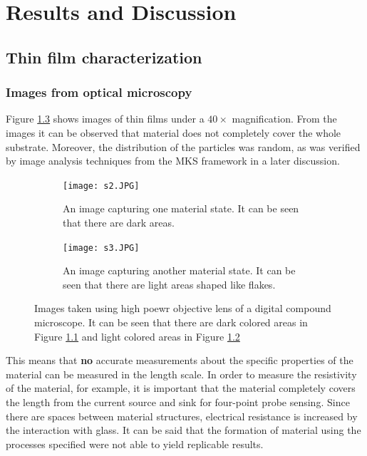 \chapter{Results and Discussion}

\section{Thin film characterization}
\subsection{Images from optical microscopy}

Figure \ref{fig:hpo} shows images of thin films under a $40\times$ magnification.
From the images it can be observed that material does not completely cover the whole substrate.
Moreover, the distribution of the particles was random, as was verified by image analysis techniques from the MKS framework in a later discussion.

\begin{figure}
  \centering
  \begin{subfigure}{.8\textwidth}
    \centering
    \texttt{[image: s2.JPG]}
    \caption[Dark areas in films]{An image capturing one material state. It can be seen that there are dark areas.}
    \label{fig:dark}
  \end{subfigure}
  \begin{subfigure}{.8\textwidth}
    \centering
    \texttt{[image: s3.JPG]}
    \caption[Light areas in films]{An image capturing another material state. It can be seen that there are light areas shaped like flakes.}
    \label{fig:light}
  \end{subfigure}
  \caption[HPO images of films]{Images taken using high poewr objective lens of a digital compound microscope. It can be seen that there are dark colored areas in Figure \ref{fig:dark} and light colored areas in Figure \ref{fig:light}}
  \label{fig:hpo}
\end{figure}

This means that \textbf{no} accurate measurements about the specific properties of the material can be measured in the length scale.
In order to measure the resistivity of the material, for example, it is important that the material completely covers the length from the current source and sink for four-point probe sensing.
Since there are spaces between material structures, electrical resistance is increased by the interaction with glass.
It can be said that the formation of material using the processes specified were not able to yield replicable results.

